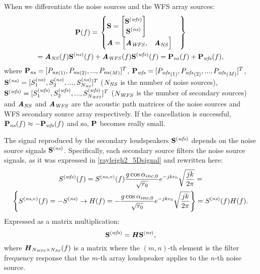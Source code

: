 When we differentiate the noise sources and the WFS array sources:
\begin{multline}
\Field[noValue][frequency][vector](f)
= \left. \begin{cases}
\vec{\signal[nothing][frequency]} = 
\begin{bmatrix}
\vec{\signal[wfs][frequency]} \\
\vec{\signal[ns][frequency]}
\end{bmatrix} \\
\AcPath[mat] =
\begin{bmatrix}
\AcPath[mat][WFS], & \AcPath[mat][NS]
\end{bmatrix}
\end{cases} \right\} \\
 = \AcPath[mat][NS](f) \vec{\signal[ns][frequency]}(f) + \AcPath[mat][WFS](f) \vec{\signal[wfs][frequency]}(f)
 = \Field[ns][frequency][vector](f) + \Field[wfs][frequency][vector](f),
\end{multline}
where $\Field[ns][frequency][vector] = [\Field[ns][frequency][scalar][1], \Field[ns][frequency][scalar][2], ..., \Field[ns][frequency][scalar][\numMeasPoints]]^T$, $\Field[wfs][frequency][vector] = [\Field[wfs][frequency][scalar][1], \Field[wfs][frequency][scalar][2], ..., \Field[wfs][frequency][scalar][\numMeasPoints]]^T$, $\vec{\signal[ns][frequency]} = [\signal[ns][frequency]_1, \signal[ns][frequency]_2, ..., \signal[ns][frequency]_{\numNS}]^T$ ($N_\mathit{NS}$ is the number of noise sources), $\vec{\signal[wfs][frequency]} = [\signal[wfs][frequency]_1, \signal[wfs][frequency]_2, ..., \signal[wfs][frequency]_{\numWFS}]^T$ ($N_\mathit{WFS}$ is the number of secondary sources) and $\AcPath[mat][NS]$ and $\AcPath[mat][WFS]$ are the acoustic path matrices of the noise sources and WFS secondary source array respectively. If the cancellation is successful, $\Field[ns][frequency][vector](f) \approx -\Field[wfs][frequency][vector](f)$ and so, $\Field[noValue][frequency][vector]$ becomes really small.

The signal reproduced by the secondary loudspeakers $\vec{\signal[wfs][frequency]}$ depends on the noise source signals $\vec{\signal[ns][frequency]}$. Specifically, each secondary source filters the noise source signals, as it was expressed in \autoref{rayleigh2_5Dsignal} and rewritten here:
\begin{multline}
\signal[wfs][frequency](f) = \signal[nsVirt][frequency](f) \frac{g \cos\normPrimaryPropAngleSection}{\sqrt{\distLinePrimSource}}
e^{-j k \distLinePrimSource} \sqrt{\frac{jk}{2\pi}} = \\
\left\{
\signal[nsVirt][frequency](f) = -\signal[ns][frequency] \rightarrow
H(f) = -\frac{g \cos\normPrimaryPropAngleSection}{\sqrt{\distLinePrimSource}}
e^{-j k \distLinePrimSource} \sqrt{\frac{jk}{2\pi}}
\right\} = \signal[ns][frequency](f) H(f).
\end{multline}
Expressed as a matrix multiplication:
\begin{equation}
\vec{\signal[wfs][frequency]} = \myMatrix{H} \vec{\signal[ns][frequency]},
\end{equation}
where $\bm{\mathit{H}}_{N_\mathit{WFS} \times N_\mathit{NS}}(f)$ is a matrix where the $(m,n)$-th element is the filter frequency response that the $m$-th array loudspeaker applies to the $n$-th noise source.

